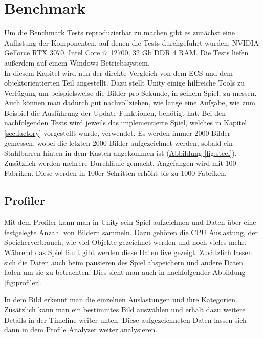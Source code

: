 \section{Benchmark}
Um die Benchmark Tests reproduzierbar zu machen gibt es zunächst eine Auflistung der Komponenten, auf denen die Tests durchgeführt wurden: NVIDIA GeForce RTX 3070, Intel Core i7 12700, 32 Gb DDR 4 RAM. Die Tests liefen außerdem auf einem Windows Betriebssystem.\\ In diesem Kapitel wird nun der direkte Vergleich von dem ECS und dem objektorientierten Teil angestellt. Dazu stellt Unity einige hilfreiche Tools zu Verfügung um beispielsweise die Bilder pro Sekunde, in seinem Spiel, zu messen. Auch können man dadurch gut nachvollziehen, wie lange eine Aufgabe, wie zum Beispiel die Ausführung der Update Funktionen, benötigt hat. Bei den nachfolgenden Tests wird jeweils das implementierte Spiel, welches in \hyperref[sec:factory]{Kapitel \ref*{sec:factory}} vorgestellt wurde, verwendet. Es werden immer 2000 Bilder gemessen, wobei die letzten 2000 Bilder aufgezeichnet werden, sobald ein Stahlbarren hinten in dem Kasten angekommen ist (\hyperref[fig:steel]{Abbildung \ref*{fig:steel}}). Zusätzlich werden mehrere Durchläufe gemacht. Angefangen wird mit 100 Fabriken. Diese werden in 100er Schritten erhöht bis zu 1000 Fabriken.
\subsection{Profiler}
Mit dem Profiler kann man in Unity sein Spiel aufzeichnen und Daten über eine festgelegte Anzahl von Bildern sammeln. Dazu gehören die CPU Auslastung, der Speicherverbrauch, wie viel Objekte gezeichnet werden und noch vieles mehr. Während das Spiel läuft gibt werden diese Daten live gezeigt. Zusätzlich lassen sich die Daten auch beim pausieren des Spiel abspeichern und andere Daten laden um sie zu betrachten. Dies sieht man auch in nachfolgender \hyperref[fig:profiler]{Abbildung \ref*{fig:profiler}}. 

In dem Bild erkennt man die einzelnen Auslastungen und ihre Kategorien. Zusätzlich kann man ein bestimmtes Bild auswählen und erhält dazu weitere Details in der Timeline weiter unten. Diese aufgezeichneten Daten lassen sich dann in dem Profile Analyzer weiter analysieren.

